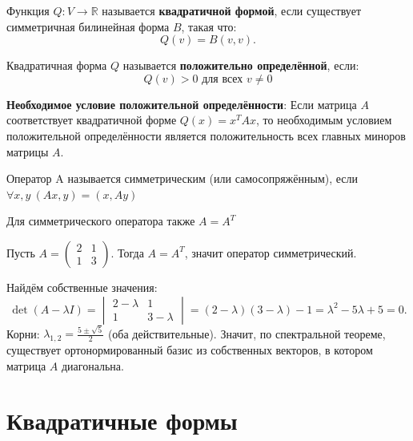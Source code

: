 \documentclass[12pt]{article}
\begin{document}
\begin{definitionbox}
Функция $ Q : V \to \mathbb{R} $ называется \textbf{квадратичной формой}, если существует симметричная билинейная форма $ B $, такая что:
$$
Q(v) = B(v, v).
$$
\end{definitionbox}

\begin{definitionbox}
Квадратичная форма $ Q $ называется \textbf{положительно определённой}, если:
$$
Q(v) > 0 \text{ для всех } v \neq 0
$$
\end{definitionbox}

\begin{remarkbox}
\textbf{Необходимое условие положительной определённости}: Если матрица $ A $ соответствует квадратичной форме $ Q(x) = x^T A x $, то необходимым условием положительной определённости является положительность всех главных миноров матрицы $ A $.
\end{remarkbox}

\begin{definitionbox}
Оператор A называется симметрическим (или самосопряжённым), если $\forall x, y \ (Ax, y) = (x, Ay)$
\end{definitionbox}

\begin{remarkbox}
Для симметрического оператора также $A = A^T$
\end{remarkbox}

\begin{examplebox}
Пусть $A =
\begin{pmatrix}
2 & 1 \\
1 & 3
\end{pmatrix}$.
Тогда $A = A^T$, значит оператор симметрический.  

Найдём собственные значения:
$$
\det(A - \lambda I) =
\begin{vmatrix}
2-\lambda & 1 \\
1 & 3-\lambda
\end{vmatrix}
= (2-\lambda)(3-\lambda) - 1 = \lambda^2 - 5\lambda + 5 = 0.
$$
Корни: $\lambda_{1,2} = \frac{5 \pm \sqrt{5}}{2}$ (оба действительные).  
Значит, по спектральной теореме, существует ортонормированный базис из собственных векторов, в котором матрица $A$ диагональна.
\end{examplebox}


\section{Квадратичные формы}
\end{document}
